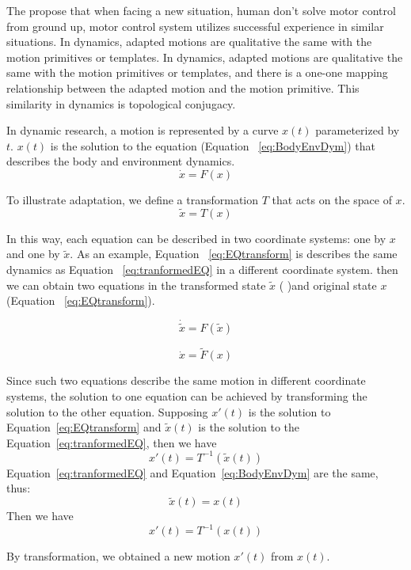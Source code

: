 The \moit propose that when facing a new situation, human don't solve motor control from ground up,
motor control system utilizes successful experience in similar situations.
In dynamics, adapted motions are qualitative the same with the motion primitives or templates.
In dynamics, adapted motions are qualitative the same with the motion primitives or templates, and there is a one-one mapping relationship between the adapted motion and the motion primitive.
This similarity in dynamics is topological conjugacy. 

In dynamic \cms research, a motion is represented by  a curve  $x(t)$ parameterized by $t$.
$x(t)$ is the solution to the equation (Equation ~\ref{eq:BodyEnvDym}) that describes the body and environment dynamics.
\begin{equation}
\dot{x}=F(x)
\label{eq:BodyEnvDym}
\end{equation}


To illustrate adaptation, we define a transformation $T$ that acts on the space of $x$.
\[
\tilde{x}=T(x)
\]

In this way, each equation can be described in two coordinate systems: one by $x$ and one by $\tilde{x}$.
As an example, Equation ~\ref{eq:EQtransform} is describes the same dynamics as  Equation ~\ref{eq:tranformedEQ} in a different coordinate system.
then we can obtain two equations in  the transformed state $\tilde{x}$ ( )and original state $x$(Equation ~\ref{eq:EQtransform}).

\begin{equation}
\dot{\tilde{x}}=F(\tilde{x})
\label{eq:tranformedEQ}
\end{equation}

\begin{equation}
\dot{x}=\tilde{F}(x)
\label{eq:EQtransform}
\end{equation}

Since such two equations describe the same motion in different coordinate systems, the solution to one equation can be achieved by transforming the solution to the other equation.
Supposing $x'(t)$ is the solution to Equation~\ref{eq:EQtransform} and $\tilde{x}(t)$ is the solution to the Equation~\ref{eq:tranformedEQ}, then we have
\[
x'(t)=T^{-1}(\tilde{x}(t))
\]
Equation~\ref{eq:tranformedEQ} and Equation~\ref{eq:BodyEnvDym} are the same, thus: 
\[
\tilde{x}(t)=x(t)
\]
Then we have
\[
x'(t)=T^{-1}(x(t))
\]

By transformation, we obtained a new motion $x'(t)$ from $x(t)$.





